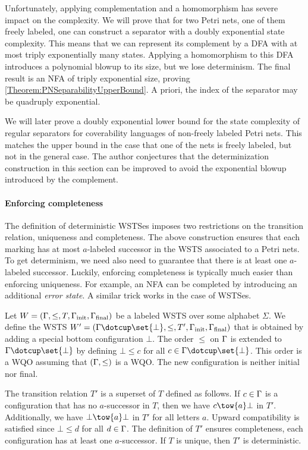 \documentclass[../../diss.tex]{subfiles}
\begin{document}
Unfortunately, applying complementation and a homomorphism has severe impact on the complexity.
We will prove that for two Petri nets, one of them freely labeled, one can construct a separator with a doubly exponential state complexity.
This means that we can represent its complement by a DFA with at most triply exponentially many states.
Applying a homomorphism to this DFA introduces a polynomial blowup to its size, but we lose determinism.
The final result is an NFA of triply exponential size, proving \cref{Theorem:PNSeparabilityUpperBound}.
A priori, the index of the separator may be quadruply exponential.

We will later prove a doubly exponential lower bound for the state complexity of regular separators for coverability languages of non-freely labeled Petri nets.
This matches the upper bound in the case that one of the nets is freely labeled, but not in the general case.
The author conjectures that the determinization construction in this section can be improved to avoid the exponential blowup introduced by the complement.

\paragraph{Enforcing completeness}

The definition of deterministic WSTSes imposes two restrictions on the transition relation, uniqueness and completeness.
The above construction ensures that each marking has at most $a$-labeled successor in the WSTS associated to a Petri nets.
To get determinism, we need also need to guarantee that there is at least one $a$-labeled successor.
Luckily, enforcing completeness is typically much easier than enforcing uniqueness.
For example, an NFA can be completed by introducing an additional \emph{error state}.
A similar trick works in the case of WSTSes.

Let $W = (\Gamma,\leq,T,\Gamma_{\text{init}}, \Gamma_{\text{final}})$ be a labeled WSTS over some alphabet $\Sigma$.
We define the WSTS $\wstsprime = (\configs \dotcup \set{\bot},\leq,T',\configs_\init,\configs_\final)$ that is obtained by adding a special bottom configuration $\bot$.
The order $\leq$ on $\Gamma$ is extended to $\configs \dotcup \set{\bot}$ by defining $\bot \leq c$ for all $c \in \configs \dotcup \set{\bot}$.
This order is a WQO assuming that $(\Gamma,\leq)$ is a WQO.\@
The new configuration is neither initial nor final.

The transition relation $T'$ is a superset of $T$ defined as follows.
If $c \in \Gamma$ is a configuration that has no $a$-successor in $T$, then we have $c \tow{a} \bot$ in $T'$.
Additionally, we have $\bot \tow{a} \bot$ in $T'$ for all letters $a$.
Upward compatibility is satisfied since $\bot \leq d$ for all $d \in \Gamma$.
The definition of $T'$ ensures completeness, \ie each configuration has at least one $a$-successor.
If $T$ is unique, then $T'$ is deterministic.
\end{document}
